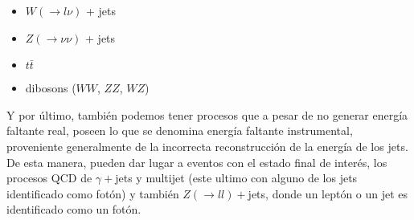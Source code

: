 \begin{itemize}
\item $W(\to l\nu)$ + jets
\item $Z(\to \nu\nu)$ + jets
\item $t\bar{t}$
\item dibosons ($WW$, $ZZ$, $WZ$)
\end{itemize}

Y por último, también podemos tener procesos que a pesar de no generar energía
faltante real, poseen lo que se denomina energía faltante instrumental,
proveniente generalmente de la incorrecta reconstrucción de la energía de los
jets. De esta manera, pueden dar lugar a eventos con el estado final de interés,
los procesos QCD de $\gamma+$jets y multijet (este ultimo con alguno de los jets
identificado como fotón) y también $Z(\to ll)+$jets, donde un leptón o un jet es
identificado como un fotón.





